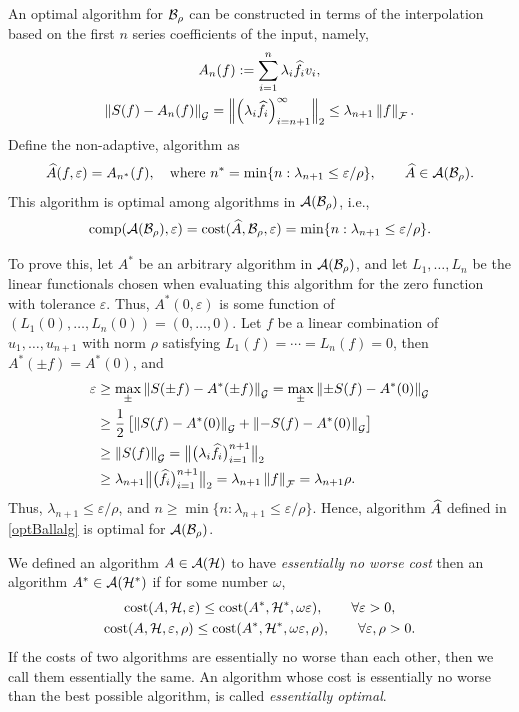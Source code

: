 \documentclass[final]{elsarticle}
\theoremstyle{definition}
\theoremstyle{remark}
\newcommand{\optAn}{A_n}
\begin{document}
An optimal algorithm for $\cb_{\rho}$ can be constructed in terms of the interpolation based on the first $n$ series coefficients of the input, namely,
\begin{gather}  \label{optAdef}
\optAn(f) := \sum_{i=1}^n \lambda_{i} \hf_{i} v_{i}, \\
\label{errOpt}
\norm[\cg]{S(f) - \optAn(f)} = \Bignorm[2]{\left(\lambda_{i} \hf_{i} \right)_{i= n+1}^{\infty}} \le \lambda_{n+1} \norm[\cf]{f}.
\end{gather}
Define the non-adaptive, algorithm as
\begin{equation} \label{optBallalg}
\hA(f,\varepsilon) = A_{n^*}(f), \quad \text{where } n^* = \min\{ n : \lambda_{n+1} \le \varepsilon/\rho \}, \qquad \hA \in \ca(\cb_{\rho}).
\end{equation}
This algorithm is optimal among algorithms in $\ca(\cb_{\rho})$, i.e.,
\[
\comp(\ca(\cb_{\rho}),\varepsilon) = \cost(\hA,\cb_{\rho},\varepsilon) =
\min\{ n : \lambda_{n+1} \le \varepsilon/\rho \}.
\]

To prove this, let $A^*$ be an arbitrary algorithm in $\ca(\cb_{\rho})$, and let $L_1, \ldots, L_n$ be the linear functionals chosen when evaluating this algorithm for the zero function with tolerance $\varepsilon$.  Thus, $A^*(0,\varepsilon)$ is some function of $(L_1(0) , \ldots, L_n(0)) = (0, \ldots, 0)$.  Let $f$ be a linear combination of $u_1, \ldots, u_{n+1}$ with norm $\rho$ satisfying  $L_1(f) = \cdots = L_n(f) = 0$, then $A^*(\pm f) = A^*(0)$, and
\begin{align*}
\varepsilon & \ge \max_{\pm} \norm[\cg]{S(\pm f) - A^*(\pm f)} =  \max_{\pm} \norm[\cg]{\pm S( f) - A^*(0)} \\
& \ge \frac 12 \left [ \norm[\cg]{S( f) - A^*(0)} + \norm[\cg]{- S( f) - A^*(0)}\right] \\
& \ge \norm[\cg]{S(f)} 
= \bignorm[2]{\big(\lambda_i\hf_i\big)_{i=1}^{n+1}} \\
& \ge \lambda_{n+1} \bignorm[2]{\big(\hf_i\big)_{i=1}^{n+1}} = \lambda_{n+1} \norm[\cf]{f} = \lambda_{n+1} \rho.
\end{align*}
Thus, $\lambda_{n+1} \le \varepsilon/\rho$, and $n \ge \min\{ n : \lambda_{n+1} \le \varepsilon/\rho \}$.  Hence, algorithm $\hA$ defined in \eqref{optBallalg} is optimal for $\ca(\cb_{\rho})$.

We defined an algorithm $A \in \ca(\ch)$ to have \emph{essentially no worse cost} then an algorithm $A^* \in \ca(\ch^*)$ if for some number $\omega$,
\begin{gather}
\cost(A,\ch,\varepsilon) \le \cost(A^*,\ch^*,\omega\varepsilon), \qquad \forall \varepsilon > 0, \\
\cost(A,\ch,\varepsilon,\rho) \le \cost(A^*,\ch^*,\omega\varepsilon,\rho), \qquad \forall \varepsilon,\rho > 0.
\end{gather}
If the costs of two algorithms are essentially no worse than each other, then we call them essentially the same.  An algorithm whose cost is essentially no worse than the best possible algorithm, is called \emph{essentially optimal}.
\end{document}
